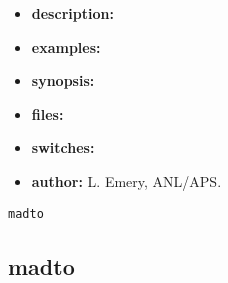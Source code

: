 \documentclass[11pt]{article}
\begin{document}
\begin{itemize}
\item {\bf description:} 

\item {\bf examples:}

\item {\bf synopsis:}

\item {\bf files:}

\item {\bf switches:}

\item {\bf author:} L. Emery, ANL/APS.
\end{itemize}

\begin{latexonly}
\newpage
\begin{center}{\Large\verb|madto|}\end{center}
\end{latexonly}
\subsection{madto}
\label{madto}
\end{document}
